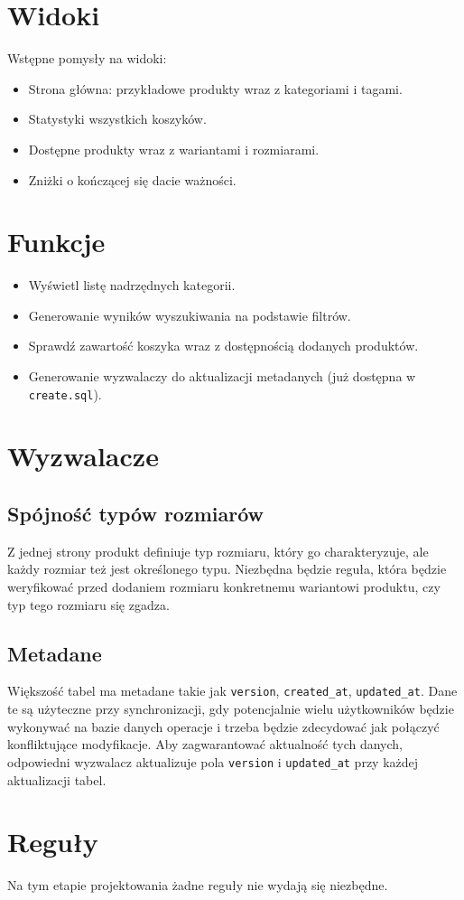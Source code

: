 \section*{Widoki}
Wstępne pomysły na widoki:
\begin{itemize}
    \item Strona główna: przykładowe produkty wraz z kategoriami i tagami.
    \item Statystyki wszystkich koszyków.
    \item Dostępne produkty wraz z wariantami i rozmiarami.
    \item Zniżki o kończącej się dacie ważności.
\end{itemize}

\section*{Funkcje}
\begin{itemize}
    \item Wyświetl listę nadrzędnych kategorii.
    \item Generowanie wyników wyszukiwania na podstawie filtrów.
    \item Sprawdź zawartość koszyka wraz z dostępnością dodanych produktów.
    \item Generowanie wyzwalaczy do aktualizacji metadanych (już dostępna w \texttt{create.sql}).
\end{itemize}

\section*{Wyzwalacze}
\subsection*{Spójność typów rozmiarów}
Z jednej strony produkt definiuje typ rozmiaru, który go charakteryzuje, ale każdy rozmiar też jest określonego typu. Niezbędna będzie reguła, która będzie weryfikować przed dodaniem rozmiaru konkretnemu wariantowi produktu, czy typ tego rozmiaru się zgadza.

\subsection*{Metadane}
Większość tabel ma metadane takie jak \texttt{version}, \texttt{created\_at}, \texttt{updated\_at}. Dane te są użyteczne przy synchronizacji, gdy potencjalnie wielu użytkowników będzie wykonywać na bazie danych operacje i trzeba będzie zdecydować jak połączyć konfliktujące modyfikacje. Aby zagwarantować aktualność tych danych, odpowiedni wyzwalacz aktualizuje pola \texttt{version} i \texttt{updated\_at} przy każdej aktualizacji tabel.

\section*{Reguły}
Na tym etapie projektowania żadne reguły nie wydają się niezbędne.



